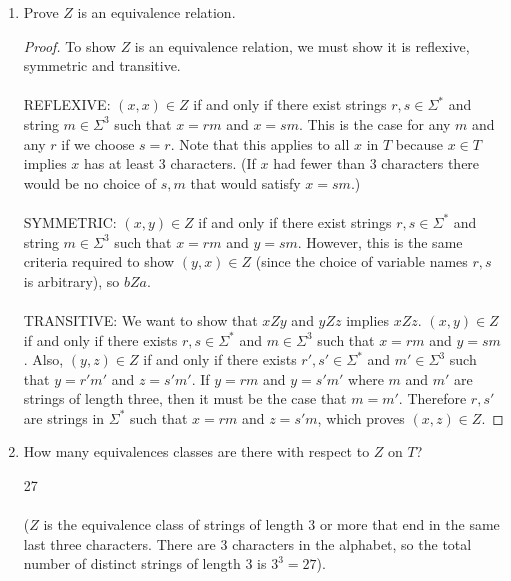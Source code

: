 \documentclass[]{exam}
\theoremstyle{definition}
\begin{document}
\begin{questions}
\begin{enumerate}[label=\alph*)]
\item Prove $Z$ is an equivalence relation.
\begin{solution}
\begin{proof}
To show $Z$ is an equivalence relation, we must show it is reflexive, symmetric
and transitive.
\\~\\
REFLEXIVE: $(x,x) \in Z$ if and only if there exist strings $r,s \in \Sigma^*$ and
string $m \in \Sigma^3$ such that $x = rm$ and $x = sm$. This is the case
for any $m$ and any $r$ if we choose $s = r$. Note that this applies to
all $x$ in $T$ because $x \in T$ implies $x$ has at least $3$ characters. (If
$x$ had fewer than $3$ characters there would be no choice of $s,m$ that would
satisfy $x = sm$.)
\\~\\
SYMMETRIC: $(x,y) \in Z$ if and only if there exist strings $r,s \in \Sigma^*$ and
string $m \in \Sigma^3$ such that $x = rm$ and $y = sm$. However, this is
the same criteria required to show $(y,x) \in Z$ (since the choice of variable
names $r,s$ is arbitrary), so $bZa$.
\\~\\
TRANSITIVE: We want to show that $xZy$ and $yZz$ implies $xZz$. $(x,y) \in Z$
if and only if there exists $r,s \in \Sigma^*$ and $m \in \Sigma^3$ such 
that $x = rm$ and $y = sm$.  Also, $(y,z) \in Z$ if and only if there 
exists $r',s' \in \Sigma^*$ 
and $m' \in \Sigma^3$ such that $y = r'm'$ and $z = s'm'$. If $y = rm$
and $y = s'm'$ where $m$ and $m'$ are strings of length three, then
it must be the case that $m = m'$. Therefore $r, s'$ are strings in
$\Sigma^*$ such that $x = rm$ and $z = s'm$, which proves $(x,z) \in Z$.
\end{proof}
\end{solution}

\item How many equivalences classes are there with respect to $Z$ on $T$?
\begin{solution}
27
\\~\\
($Z$ is the equivalence class of strings of length $3$ or more that end in
the same last three characters. There are $3$ characters in the alphabet,
so the total number of distinct strings of length $3$ is $3^3 = 27$).
\end{solution}
\end{enumerate}


\end{questions}
\end{document}
